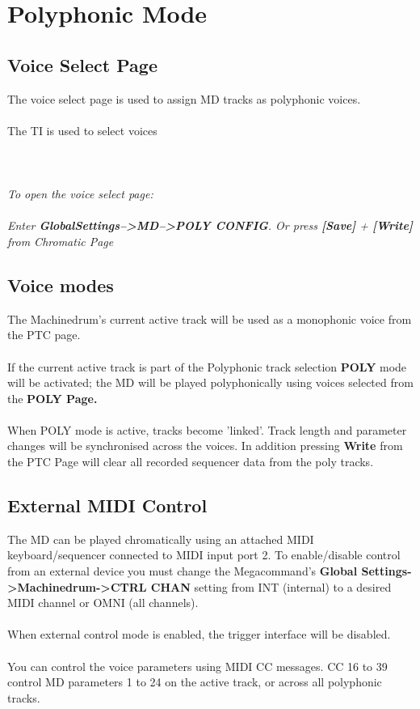 \chapter{Polyphonic Mode}

\section{Voice Select Page}
The voice select page is used to assign MD tracks as polyphonic voices.\\\\
The TI is used to select voices\\\\
\\\\
\textit{To open the voice select page:\\\\
Enter \textbf{GlobalSettings-->MD-->POLY CONFIG}. Or press \textbf{[Save]} + \textbf{[Write]} from  Chromatic Page}

\section{Voice modes}

The Machinedrum's current active track will be used as a monophonic voice from the PTC page.\\
\\
If the current active track is part of the Polyphonic track selection \textbf{POLY} mode will be activated; the MD will be played polyphonically using voices selected from the \textbf{POLY Page.}\\
\\
When POLY mode is active, tracks become 'linked'. Track length and parameter changes will be synchronised across the voices. In addition pressing \textbf{Write} from the PTC Page will clear all recorded sequencer data from the poly tracks.

\section{External MIDI Control}
The MD can be played chromatically using an attached MIDI keyboard/sequencer connected to MIDI input port 2.
To enable/disable control from an external device you must change the Megacommand's \textbf{Global Settings->Machinedrum->CTRL CHAN} setting from INT (internal) to a desired MIDI channel or OMNI (all channels).\\
\\
When external control mode is enabled, the trigger interface will be disabled.\\
\\
You can control the voice parameters using MIDI CC messages. CC 16 to 39 control MD parameters 1 to 24 on the active track, or across all polyphonic tracks.


